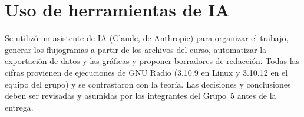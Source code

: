 \section{Uso de herramientas de IA}
Se utilizó un asistente de IA (Claude, de Anthropic) para organizar el trabajo, generar los flujogramas a partir de los archivos del curso, automatizar la exportación de datos y las gráficas y proponer borradores de redacción. Todas las cifras provienen de ejecuciones de GNU Radio (3.10.9 en Linux y 3.10.12 en el equipo del grupo) y se contrastaron con la teoría. Las decisiones y conclusiones deben ser revisadas y asumidas por los integrantes del Grupo~5 antes de la entrega.
